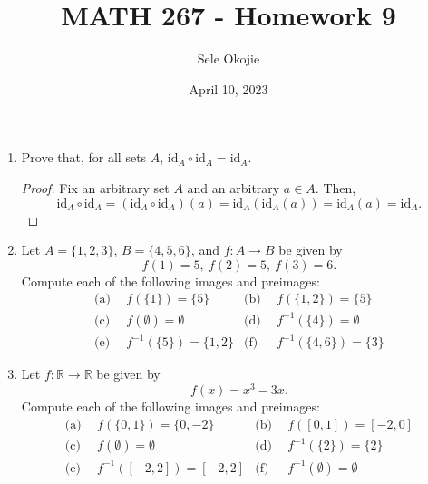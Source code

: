 \documentclass{article}
\title{MATH 267 - Homework 9}
\author{Sele Okojie}
\date{April 10, 2023}
\begin{document}
    \maketitle

    \begin{enumerate}

        \item Prove that, for all sets $A$, $\mathrm{id}_A \circ \mathrm{id}_A = \mathrm{id}_A$.
            \begin{proof}
                Fix an arbitrary set $A$ and an arbitrary $a\in A$. Then,
                \[
                    \mathrm{id}_A \circ \mathrm{id}_A = (\mathrm{id}_A \circ \mathrm{id}_A)(a) = \mathrm{id}_A(\mathrm{id}_A(a)) = \mathrm{id}_A(a) = \mathrm{id}_A.
                \]
            \end{proof}

	\item Let $A = \{ 1, 2, 3 \}$, $B = \{ 4, 5, 6 \}$, and $f : A \rightarrow B$ be given by
		\[
			f(1) = 5, \ f(2) = 5, \ f(3) = 6.
		\]
		Compute each of the following images and preimages:
		\begin{align*}
			\text{(a)} & \ \ f(\{ 1 \}) = \{ 5 \} & \text{(b)} & \ \ f(\{ 1, 2 \}) = \{ 5 \} \\
			\text{(c)} & \ \ f( \emptyset ) = \emptyset & \text{(d)} & \ \ f^{\minus1}(\{ 4 \}) = \emptyset \\
			\text{(e)} & \ \ f^{\minus1}(\{ 5 \}) = \{ 1, 2 \} & \text{(f)} & \ \ f^{\minus1}(\{ 4, 6 \}) = \{ 3 \}
		\end{align*}

	\item Let $f : \mathbb{R} \rightarrow \mathbb{R}$ be given by
		\[
			f(x) = x^3 - 3x.
		\]
		Compute each of the following images and preimages:
		\begin{align*}
			\text{(a)} & \ \ f(\{0, 1\}) = \{ 0, \minus2 \} & \text{(b)} & \ \ f([0,1]) = [\minus2, 0] \\
			\text{(c)} & \ \ f(\emptyset) = \emptyset & \text{(d)} & \ \ f^{\minus1}(\{ 2 \}) = \{ 2 \} \\
			\text{(e)} & \ \ f^{\minus1}([-2,2]) = [\minus2, 2] & \text{(f)} & \ \ f^{\minus1}(\emptyset) = \emptyset
		\end{align*}


\end{enumerate}
\end{document}
